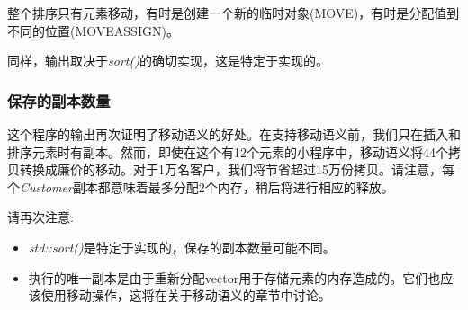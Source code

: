 整个排序只有元素移动，有时是创建一个新的临时对象(MOVE)，有时是分配值到不同的位置(MOVEASSIGN)。

同样，输出取决于\textit{sort()}的确切实现，这是特定于实现的。

\subsubsection{保存的副本数量}

这个程序的输出再次证明了移动语义的好处。在支持移动语义前，我们只在插入和排序元素时有副本。然而，即使在这个有12个元素的小程序中，移动语义将44个拷贝转换成廉价的移动。对于1万名客户，我们将节省超过15万份拷贝。请注意，每个\textit{Customer}副本都意味着最多分配2个内存，稍后将进行相应的释放。

请再次注意:

\begin{itemize}
	\item \textit{std::sort()}是特定于实现的，保存的副本数量可能不同。
	\item 执行的唯一副本是由于重新分配vector用于存储元素的内存造成的。它们也应该使用移动操作，这将在关于移动语义的章节中讨论。
\end{itemize}

























